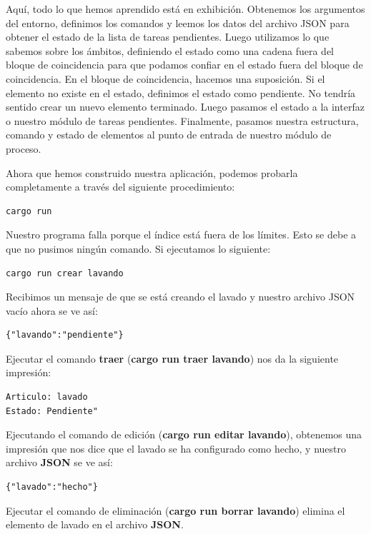Aquí, todo lo que hemos aprendido está en exhibición. Obtenemos los argumentos del entorno, definimos los comandos y leemos los datos del archivo JSON para obtener el estado de la lista de tareas pendientes. Luego utilizamos lo que sabemos sobre los ámbitos, definiendo el estado como una cadena fuera del bloque de coincidencia para que podamos confiar en el estado fuera del bloque de coincidencia. En el bloque de coincidencia, hacemos una suposición. Si el elemento no existe en el estado, definimos el estado como pendiente. No tendría sentido crear un nuevo elemento terminado. Luego pasamos el estado a la interfaz o nuestro módulo de tareas pendientes. Finalmente, pasamos nuestra estructura, comando y estado de elementos al punto de entrada de nuestro módulo de proceso.

Ahora que hemos construido nuestra aplicación, podemos probarla completamente a través del siguiente procedimiento:

\begin{lstlisting}
cargo run
\end{lstlisting}

Nuestro programa falla porque el índice está fuera de los límites. Esto se debe a que no pusimos ningún comando. Si ejecutamos lo siguiente:

\begin{lstlisting}
cargo run crear lavando
\end{lstlisting}

Recibimos un mensaje de que se está creando el lavado y nuestro archivo JSON vacío ahora se ve así:

\begin{lstlisting}
{"lavando":"pendiente"}
\end{lstlisting}


Ejecutar el comando \textbf{traer} (\textbf{cargo run traer lavando}) nos da la siguiente impresión:

\begin{lstlisting}
Articulo: lavado
Estado: Pendiente"
\end{lstlisting}


Ejecutando el comando de edición (\textbf{cargo run editar lavando}), obtenemos una impresión que nos dice que el lavado se ha configurado como hecho, y nuestro archivo \textbf{JSON} se ve así:

\begin{lstlisting}
{"lavado":"hecho"}
\end{lstlisting}


Ejecutar el comando de eliminación (\textbf{cargo run borrar lavando}) elimina el elemento de lavado en el archivo \textbf{JSON}.

